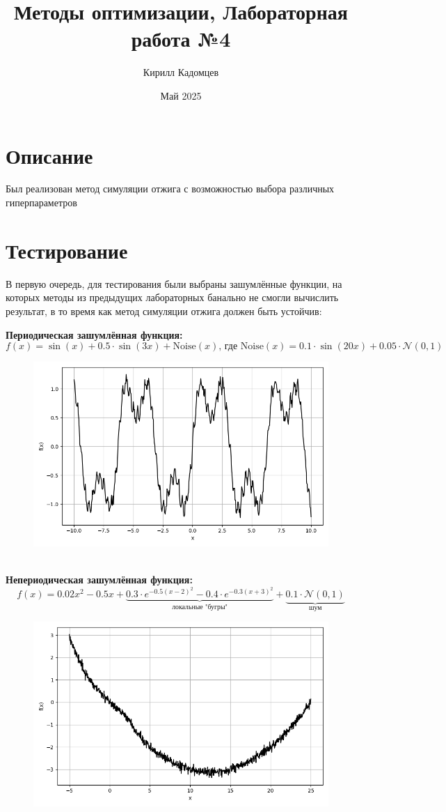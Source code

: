 \documentclass{article}
\title{Методы оптимизации, Лабораторная работа №4}
\author{Кирилл Кадомцев}
\date{Май 2025}
\begin{document}
\maketitle
\tableofcontents

\section{Описание}
Был реализован метод симуляции отжига с возможностью выбора различных гиперпараметров


\newpage

\section{Тестирование}
В первую очередь, для тестирования были выбраны зашумлённые функции, на которых методы из предыдущих лабораторных банально не смогли вычислить результат, в то время как метод симуляции отжига должен быть устойчив:

\textbf{Периодическая зашумлённая функция:} \\
\[f(x) = \sin(x) + 0.5 \cdot \sin(3x) + \text{Noise}(x)\text{, где Noise}(x) = 0.1 \cdot \sin(20x) + 0.05 \cdot \mathcal{N}(0, 1)\]
\begin{figure}[H]
    \centering
    \includegraphics[width=0.5\linewidth]{noisy_periodic.png}
\end{figure} \\
\textbf{Непериодическая зашумлённая функция:} \\
\[f(x) = 0.02x^2 - 0.5x + \underbrace{0.3 \cdot e^{-0.5(x - 2)^2} - 0.4 \cdot e^{-0.3(x + 3)^2}}_{\text{локальные "бугры"}} + \underbrace{0.1 \cdot \mathcal{N}(0,1)}_{\text{шум}}\]
\begin{figure}[H]
    \centering
    \includegraphics[width=0.5\linewidth]{noisy_nonperiodic.png}
\end{figure}
\end{document}
